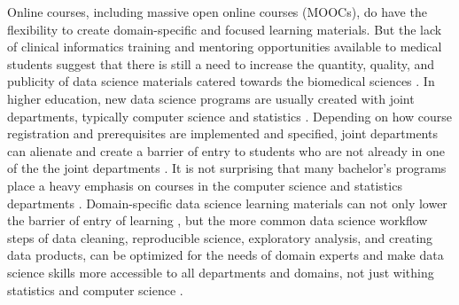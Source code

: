 \documentclass[020-persona\_validation.tex]{subfiles}
\begin{document}
    Online courses, including massive open online courses (MOOCs),
    do have the flexibility to create
    domain-specific and focused learning materials.
    But the lack of clinical informatics training and mentoring opportunities available to medical students
    suggest that there is still a need to increase the quantity, quality, and publicity of
    data science materials catered towards the biomedical sciences
    \cite{banerjeeMedicalStudentAwareness2015}.
    In higher education,
    new data science programs are usually created with joint departments,
    typically computer science and statistics
    \cite{songBigDataData2016}.
    Depending on how course registration and prerequisites are implemented and specified,
    joint departments can alienate and create a barrier of entry to students who are not already
    in one of the the joint departments
    \cite{kelleherLoweringBarriersProgramming2005}.
    It is not surprising that many bachelor's programs place a heavy emphasis on
    courses in the computer science and statistics departments
    \cite{songBigDataData2016}.
    Domain-specific data science learning materials can not only lower the barrier of entry of learning
    \cite{ambrose2010learning},
    but the more common data science workflow steps of
    data cleaning, reproducible science, exploratory analysis, and creating data products,
    can be optimized for the needs of domain experts and make
    data science skills more accessible to all departments and domains,
    not just withing statistics and computer science
    \cite{krossDemocratizationDataScience2020, cc2020, ccdsc2021, payneBiomedicalInformaticsMeets2018}.

\end{document}
